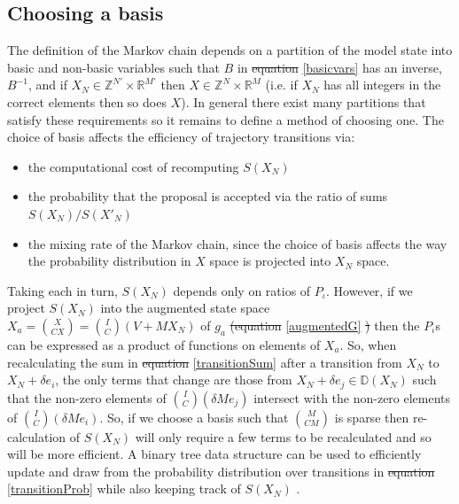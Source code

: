 \documentclass{article}
\providecommand{\DIFaddtex}[1]{{\protect\color{blue}\uwave{#1}}} %
\providecommand{\DIFdeltex}[1]{{\protect\color{red}\sout{#1}}}                      %
\providecommand{\DIFaddbegin}{} %
\providecommand{\DIFaddend}{} %
\providecommand{\DIFdelbegin}{} %
\providecommand{\DIFdelend}{} %
\providecommand{\DIFadd}[1]{\texorpdfstring{\DIFaddtex{#1}}{#1}} %
\providecommand{\DIFdel}[1]{\texorpdfstring{\DIFdeltex{#1}}{}} %
\newcommand{\DIFscaledelfig}{0.5}
\newlength{\DIFdelgraphicswidth} %
\newlength{\DIFdelgraphicsheight} %
\newcommand{\DIFaddincludegraphics}[2][]{{\color{blue}\fbox{\DIFOincludegraphics[#1]{#2}}}} %
\newcommand{\DIFdelincludegraphics}[2][]{%
\sbox{\DIFdelgraphicsbox}{\DIFOincludegraphics[#1]{#2}}%
\settoboxwidth{\DIFdelgraphicswidth}{\DIFdelgraphicsbox} %
\settoboxtotalheight{\DIFdelgraphicsheight}{\DIFdelgraphicsbox} %
\scalebox{\DIFscaledelfig}{%
\parbox[b]{\DIFdelgraphicswidth}{\usebox{\DIFdelgraphicsbox}\\[-\baselineskip] \rule{\DIFdelgraphicswidth}{0em}}\llap{\resizebox{\DIFdelgraphicswidth}{\DIFdelgraphicsheight}{%
\setlength{\unitlength}{\DIFdelgraphicswidth}%
\begin{picture}(1,1)%
\thicklines\linethickness{2pt} %
{\color[rgb]{1,0,0}\put(0,0){\framebox(1,1){}}}%
{\color[rgb]{1,0,0}\put(0,0){\line( 1,1){1}}}%
{\color[rgb]{1,0,0}\put(0,1){\line(1,-1){1}}}%
\end{picture}%
}\hspace*{3pt}}} %
} %
\DeclareRobustCommand{\DIFaddbegin}{\DIFOaddbegin \let\includegraphics\DIFaddincludegraphics} %
\DeclareRobustCommand{\DIFaddend}{\DIFOaddend \let\includegraphics\DIFOincludegraphics} %
\DeclareRobustCommand{\DIFdelbegin}{\DIFOdelbegin \let\includegraphics\DIFdelincludegraphics} %
\DeclareRobustCommand{\DIFdelend}{\DIFOaddend \let\includegraphics\DIFOincludegraphics} %
\begin{document}
\subsection{Choosing a basis}
\label{basis}
The definition of the Markov chain depends on a partition of the model state into basic and non-basic variables such that $B$ in \DIFdelbegin \DIFdel{equation }\DIFdelend \DIFaddbegin \DIFadd{Equation }\DIFaddend \eqref{basicvars} has an inverse, $B^{-1}$, and if $X_N \in \mathbb{Z}^{N'} \times \mathbb{R}^{M'}$ then $X \in \mathbb{Z}^{N} \times \mathbb{R}^{M}$ (i.e. if $X_N$ has all integers in the correct elements then so does $X$). In general there exist many partitions that satisfy these requirements so it remains to define a method of choosing one. The choice of basis affects the efficiency of trajectory transitions via:
\begin{itemize}
\item the computational cost of recomputing $S(X_N)$

\item the probability that the proposal is accepted via the ratio of sums $S(X_N)/S(X'_N)$

\item the mixing rate of the Markov chain, since the choice of basis affects the way the probability distribution in $X$ space is projected into $X_N$ space.
\end{itemize}

Taking each in turn, $S(X_N)$ depends only on ratios of $P_\iota$. However, if we project $S(X_N)$ into the augmented state space $X_a = {X \choose CX} = {I \choose C}(V + MX_N)$ of $g_a$ \DIFdelbegin \DIFdel{(equation }\DIFdelend \eqref{augmentedG} \DIFdelbegin \DIFdel{) }\DIFdelend then the $P_\iota$s can be expressed as a product of functions on elements of $X_a$. So, when recalculating the sum in \DIFdelbegin \DIFdel{equation }\DIFdelend \eqref{transitionSum} after a transition from $X_N$ to $X_N + \delta e_i$, the only terms that change are those from $X_N + \delta e_j \in \mathbb{D}(X_N)$ such that the non-zero elements of ${I \choose C}(\delta Me_j)$ intersect with the non-zero elements of ${I \choose C}(\delta Me_i)$. So, if we choose a basis such that ${M \choose CM}$ is sparse then re-calculation of $S(X_N)$ will only require a few terms to be recalculated and so will be more efficient. A binary tree data structure can be used to efficiently update and draw from the probability distribution over transitions in \DIFdelbegin \DIFdel{equation }\DIFdelend \eqref{transitionProb} while also keeping track of $S(X_N)$ \citep{TangMutableCategorical}. \DIFdelbegin %
\end{document}
